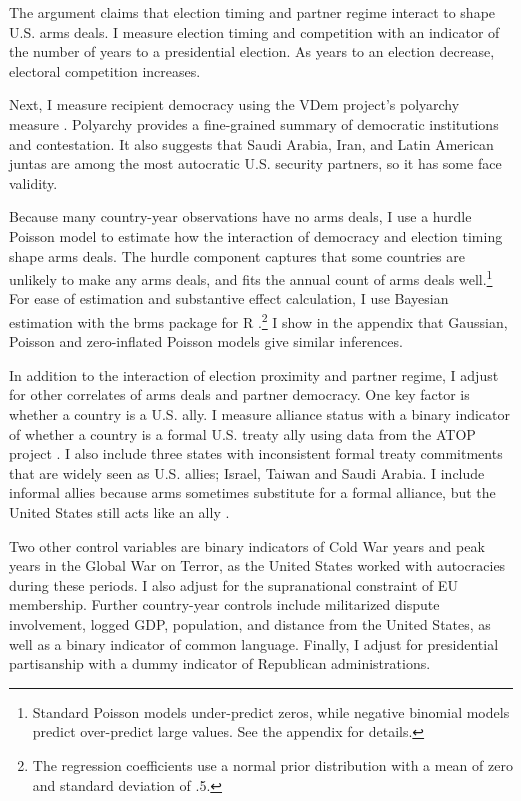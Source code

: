 \documentclass[12pt]{article}
\begin{document}
The argument claims that election timing and partner regime interact to shape U.S. arms deals. 
I measure election timing and competition with an indicator of the number of years to a presidential election. 
As years to an election decrease, electoral competition increases. 


Next, I measure recipient democracy using the VDem project's polyarchy measure \citep{Coppedgeetal2008}. 
Polyarchy provides a fine-grained summary of democratic institutions and contestation.
It also suggests that Saudi Arabia, Iran, and Latin American juntas are among the most autocratic U.S. security partners, so it has some face validity.  


Because many country-year observations have no arms deals, I use a hurdle Poisson model to estimate how the interaction of democracy and election timing shape arms deals.
The hurdle component captures that some countries are unlikely to make any arms deals, and fits the annual count of arms deals well.\footnote{Standard Poisson models under-predict zeros, while negative binomial models predict over-predict large values. See the appendix for details.} 
For ease of estimation and substantive effect calculation, I use Bayesian estimation with the brms package for \textsf{R} \citep{Buerkner2017}.\footnote{The regression coefficients use a normal prior distribution with a mean of zero and standard deviation of .5.}
I show in the appendix that Gaussian, Poisson and zero-inflated Poisson models give similar inferences. 


In addition to the interaction of election proximity and partner regime, I adjust for other correlates of arms deals and partner democracy. 
One key factor is whether a country is a U.S. ally. 
I measure alliance status with a binary indicator of whether a country is a formal U.S. treaty ally using data from the ATOP project \citep{Leedsetal2002}.
I also include three states with inconsistent formal treaty commitments that are widely seen as U.S. allies; Israel, Taiwan and Saudi Arabia. 
I include informal allies because arms sometimes substitute for a formal alliance, but the United States still acts like an ally \citep{Yarhi-Miloetal2016}. 


Two other control variables are binary indicators of Cold War years and peak years in the Global War on Terror, as the United States worked with autocracies during these periods. 
I also adjust for the supranational constraint of EU membership. 
Further country-year controls include militarized dispute involvement, logged GDP, population, and distance from the United States, as well as a binary indicator of common language. 
Finally, I adjust for presidential partisanship with a dummy indicator of Republican administrations.  
\end{document}
